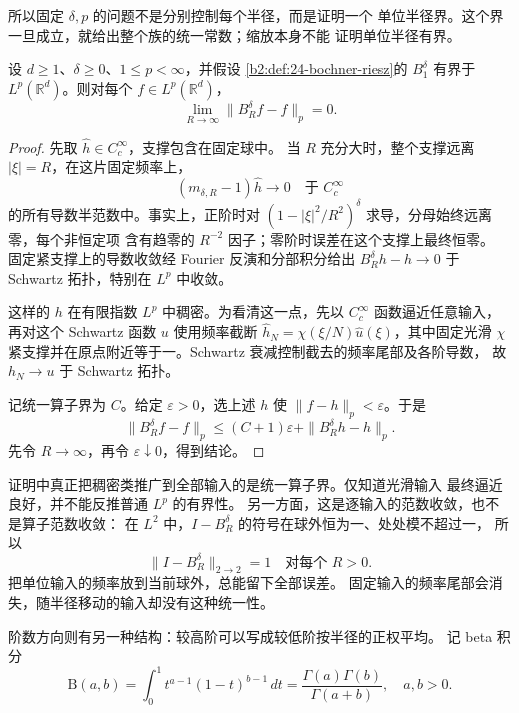 所以固定 \(\delta,p\) 的问题不是分别控制每个半径，而是证明一个
单位半径界。这个界一旦成立，就给出整个族的统一常数；缩放本身不能
证明单位半径有界。

\begin{proposition}[有界性推出范数逼近]\label{b2:prop:24-strong-approximation}
设 \(d\geq1\)、\(\delta\geq0\)、\(1\leq p<\infty\)，并假设
\cref{b2:def:24-bochner-riesz}的 \(B_1^\delta\) 有界于
\(L^p(\mathbb R^d)\)。则对每个 \(f\in L^p(\mathbb R^d)\)，
\[
 \lim_{R\to\infty}\|B_R^\delta f-f\|_p=0.
\]
\end{proposition}
\begin{proof}
先取 \(\widehat h\in C_c^\infty\)，支撑包含在固定球中。
当 \(R\) 充分大时，整个支撑远离 \(|\xi|=R\)，在这片固定频率上，
\[
 (m_{\delta,R}-1)\widehat h\longrightarrow0
       \quad\text{于 }C_c^\infty
\]
的所有导数半范数中。事实上，正阶时对
\((1-|\xi|^2/R^2)^\delta\) 求导，分母始终远离零，每个非恒定项
含有趋零的 \(R^{-2}\) 因子；零阶时误差在这个支撑上最终恒零。
固定紧支撑上的导数收敛经 Fourier 反演和分部积分给出
\(B_R^\delta h-h\to0\) 于 Schwartz 拓扑，特别在 \(L^p\) 中收敛。

这样的 \(h\) 在有限指数 \(L^p\) 中稠密。为看清这一点，先以
\(C_c^\infty\) 函数逼近任意输入，再对这个 Schwartz 函数 \(u\)
使用频率截断
\(\widehat h_N=\chi(\xi/N)\widehat u(\xi)\)，其中固定光滑 \(\chi\)
紧支撑并在原点附近等于一。Schwartz 衰减控制截去的频率尾部及各阶导数，
故 \(h_N\to u\) 于 Schwartz 拓扑。

记统一算子界为 \(C\)。给定 \(\varepsilon>0\)，选上述 \(h\)
使 \(\|f-h\|_p<\varepsilon\)。于是
\[
 \|B_R^\delta f-f\|_p
 \leq (C+1)\varepsilon+\|B_R^\delta h-h\|_p.
\]
先令 \(R\to\infty\)，再令 \(\varepsilon\downarrow0\)，得到结论。
\end{proof}

证明中真正把稠密类推广到全部输入的是统一算子界。仅知道光滑输入
最终逼近良好，并不能反推普通 \(L^p\) 的有界性。
另一方面，这是逐输入的范数收敛，也不是算子范数收敛：
在 \(L^2\) 中，\(I-B_R^\delta\) 的符号在球外恒为一、处处模不超过一，
所以
\[
 \|I-B_R^\delta\|_{2\to2}=1\quad\text{对每个 }R>0.
\]
把单位输入的频率放到当前球外，总能留下全部误差。
固定输入的频率尾部会消失，随半径移动的输入却没有这种统一性。

\ProseParagraphBreak
阶数方向则有另一种结构：较高阶可以写成较低阶按半径的正权平均。
记 beta 积分
\[
 \mathrm B(a,b)=\int_0^1t^{a-1}(1-t)^{b-1}\,dt
       =\frac{\Gamma(a)\Gamma(b)}{\Gamma(a+b)},\quad a,b>0.
\]

